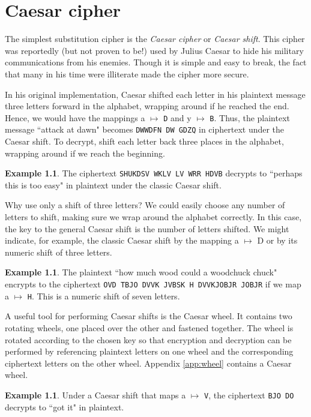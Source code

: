 \documentclass{book}
\theoremstyle{plain}
\theoremstyle{definition}
\newtheorem{example}[theorem]{Example}
\newcommand{\ciphertext}[1]{\texttt{#1}} %
\begin{document}
\chapter{Caesar cipher}
The simplest substitution cipher is the {\it Caesar cipher} or {\it Caesar shift}. This cipher was reportedly (but not proven to be!) used by Julius Caesar to hide his military communications from his enemies. Though it is simple and easy to break, the fact that many in his time were illiterate made the cipher more secure.

In his original implementation, Caesar shifted each letter in his plaintext message three letters forward in the alphabet, wrapping around if he reached the end. Hence, we would have the mappings a $\mapsto$ \ciphertext{D} and y $\mapsto$ \ciphertext{B}. Thus, the plaintext message ``attack at dawn" becomes \ciphertext{DWWDFN DW GDZQ} in ciphertext under the Caesar shift. To decrypt, shift each letter back three places in the alphabet, wrapping around if we reach the beginning.

\begin{example}
The ciphertext \ciphertext{SHUKDSV WKLV LV WRR HDVB} decrypts to ``perhaps this is too easy" in plaintext under the classic Caesar shift.
\end{example}

Why use only a shift of three letters? We could easily choose any number of letters to shift, making sure we wrap around the alphabet correctly. In this case, the key to the general Caesar shift is the number of letters shifted. We might indicate, for example, the classic Caesar shift by the mapping a $\mapsto$ D or by its numeric shift of three letters.

\begin{example}
The plaintext ``how much wood could a woodchuck chuck" encrypts to the ciphertext \ciphertext{OVD TBJO DVVK JVBSK H DVVKJOBJR JOBJR} if we map a $\mapsto$ \ciphertext{H}. This is a numeric shift of seven letters.
\end{example}

A useful tool for performing Caesar shifts is the Caesar wheel. It contains two rotating wheels, one placed over the other and fastened together. The wheel is rotated according to the chosen key so that encryption and decryption can be performed by referencing plaintext letters on one wheel and the corresponding ciphertext letters on the other wheel. Appendix \ref{app:wheel} contains a Caesar wheel.

\begin{example}
Under a Caesar shift that maps a $\mapsto$ \ciphertext{V}, the ciphertext \ciphertext{BJO DO} decrypts to ``got it" in plaintext.
\end{example}
\end{document}
